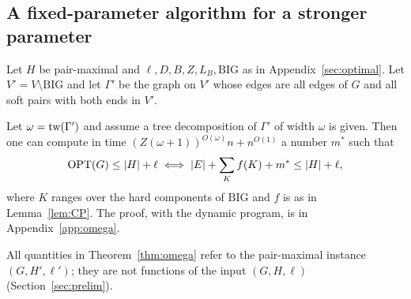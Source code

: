 \subsection{A fixed-parameter algorithm for a stronger parameter}
Let $H$ be pair-maximal and $\ell,D,B,Z,L_B,\mathrm{BIG}$ as in Appendix~\ref{sec:optimal}. Let $V'=V\setminus\mathrm{BIG}$ and let $\Gamma'$ be the graph on $V'$ whose edges are all edges of $G$ and all soft pairs with both ends in $V'$.
\begin{theorem}\label{thm:omega}
Let $\omega=\mathrm{tw}(\Gamma')$ and assume a tree decomposition of $\Gamma'$ of width $\omega$ is given. Then one can compute in time $(Z(\omega+1))^{O(\omega)}n+n^{O(1)}$ a number $m^*$ such that
\[
\mathrm{OPT}(G)\le|H|+\ell\iff|E|+\sum_{K}f(K)+m^*\le|H|+\ell ,
\]
where $K$ ranges over the hard components of $\mathrm{BIG}$ and $f$ is as in Lemma~\ref{lem:CP}. The proof, with the dynamic program, is in Appendix~\ref{app:omega}.
\end{theorem}
All quantities in Theorem~\ref{thm:omega} refer to the pair-maximal instance $(G,H',\ell')$; they are not functions of the input $(G,H,\ell)$ (Section~\ref{sec:prelim}).


